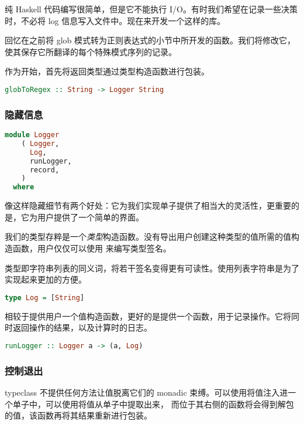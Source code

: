 \documentclass[./main.tex]{subfiles}
\begin{document}
纯 Haskell 代码编写很简单，但是它不能执行 I/O。有时我们希望在记录一些决策时，不必将 log 信息写入文件中。现在来开发一个这样的库。

回忆在之前将 glob 模式转为正则表达式的小节中所开发的函数。我们将修改它，使其保存它所翻译的每个特殊模式序列的记录。

作为开始，首先将返回类型通过类型构造函数进行包装。

\begin{lstlisting}[language=Haskell]
  globToRegex :: String -> Logger String
\end{lstlisting}

\subsubsection*{隐藏信息}

\begin{lstlisting}[language=Haskell]
  module Logger
    ( Logger,
      Log,
      runLogger,
      record,
    )
  where
\end{lstlisting}

像这样隐藏细节有两个好处：它为我们实现单子提供了相当大的灵活性，更重要的是，它为用户提供了一个简单的界面。

我们的类型存粹是一个\textit{类型}构造函数。没有导出用户创建这种类型的值所需的值构造函数，用户仅仅可以使用  来编写类型签名。

 类型即字符串列表的同义词，将若干签名变得更有可读性。使用列表字符串是为了实现起来更加的方便。

\begin{lstlisting}[language=Haskell]
  type Log = [String]
\end{lstlisting}

相较于提供用户一个值构造函数，更好的是提供一个函数，用于记录操作。它将同时返回操作的结果，以及计算时的日志。

\begin{lstlisting}[language=Haskell]
  runLogger :: Logger a -> (a, Log)
\end{lstlisting}

\subsubsection*{控制退出}

 typeclass 不提供任何方法让值脱离它们的 monadic 束缚。可以使用将值注入进一个单子中，可以使用\acode{(>>=)}将值从单子中提取出来，
而位于其右侧的函数将会得到解包的值，该函数再将其结果重新进行包装。
\end{document}
